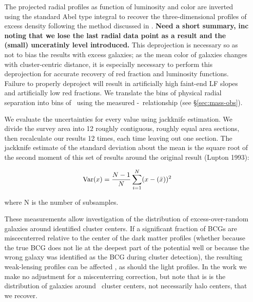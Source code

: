 \documentclass{emulateapj}
\begin{document}
The projected radial profiles as function of luminosity and color are inverted using the standard Abel type integral to recover the three-dimensional profiles of excess density following the method discussed in \citet{Johnston07a,Sheldon07b}. {\bf Need a short summary, inc noting that we lose the last radial data point as a result and the (small) unceratinly level introduced.} This deprojection is necessary so as not to bias the results with excess galaxies; as the mean color of galaxies changes with cluster-centric distance, it is especially necessary to perform this deprojection for accurate recovery of red fraction and luminosity functions. Failure to properly deproject will result in artificially high faint-end LF slopes and artificially low red fractions. We translate the bins of physical radial separation into bins of \rad\ using the measured \rtwo-\Ntwo\ relationship (see \S \ref{sec:mass-obs}).

We evaluate the uncertainties for every value using jackknife estimation. We divide the survey area into 12 roughly contiguous, roughly equal area sections, then recalculate our results 12 times, each time leaving out one section. The jackknife estimate of the standard deviation about the mean is the square root of the second moment of this set of results around the original result (Lupton 1993): 

\begin{equation}
{\rm Var}(x) = \frac{N-1}{N} \sum_{i=1}^N (x - (\bar x))^2
\end{equation} 

where N is the number of subsamples.

These measurements allow investigation of the distribution of
excess-over-random galaxies around identified cluster centers. If a significant
fraction of BCGs are miscecnterred relative to the center of the dark matter
profiles (whether because the true BCG does not lie at the deepest part of the
potential well or because the wrong galaxy was identified as the BCG during
cluster detection), the resulting weak-lensing profiles can be affected
\citet{Johnston07a}, as should the light profiles. In the work we make no
adjustment for a miscenterring correction, but note that is is the distribution
of galaxies around \maxbcg\ cluster centers, not necessarily halo centers, that
we recover.
\end{document}
